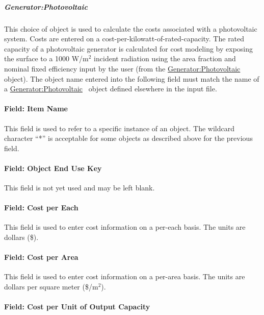 \subparagraph{Generator:Photovoltaic}\label{generatorphotovoltaic}

This choice of object is used to calculate the costs associated with a photovoltaic system. Costs are entered on a cost-per-kilowatt-of-rated-capacity. The rated capacity of a photovoltaic generator is calculated for cost modeling by exposing the surface to a 1000 W/m\(^{2}\) incident radiation using the area fraction and nominal fixed efficiency input by the user (from the \hyperref[generatorphotovoltaic-000]{Generator:Photovoltaic} object). The object name entered into the following field must match the name of a \hyperref[generatorphotovoltaic-000]{Generator:Photovoltaic} ~object defined elsewhere in the input file.

\paragraph{Field: Item Name}\label{field-item-name}

This field is used to refer to a specific instance of an object. The wildcard character ``*'' is acceptable for some objects as described above for the previous field.

\paragraph{Field: Object End Use Key}\label{field-object-end-use-key}

This field is not yet used and may be left blank.

\paragraph{Field: Cost per Each}\label{field-cost-per-each}

This field is used to enter cost information on a per-each basis. The units are dollars (\$).

\paragraph{Field: Cost per Area}\label{field-cost-per-area}

This field is used to enter cost information on a per-area basis. The units are dollars per square meter (\$/m\(^{2}\)).

\paragraph{Field: Cost per Unit of Output Capacity}\label{field-cost-per-unit-of-output-capacity}

